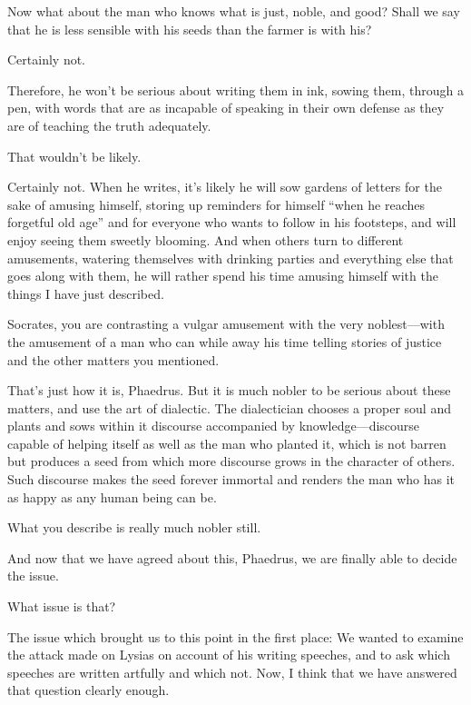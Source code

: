 \saysocrates Now what about the man who knows what is just, noble, and
good? Shall we say that he is less sensible with his seeds than the
farmer is with his?

\sayphaedrus Certainly not.

\saysocrates Therefore, he won’t be serious about writing them in ink,
sowing them, through a pen, with words that are as incapable of speaking
in their own defense as they are of teaching the truth adequately.

\sayphaedrus That wouldn’t be likely.

\saysocrates Certainly not. When he writes, it’s likely he will sow gardens 
of letters for the sake of amusing himself, storing up reminders
for himself “when he reaches forgetful old age” and for everyone who
wants to follow in his footsteps, and will enjoy seeing them sweetly
blooming. And when others turn to different amusements, watering
themselves with drinking parties and everything else that goes along
with them, he will rather spend his time amusing himself with the things
I have just described.

\sayphaedrus Socrates, you are contrasting a vulgar amusement with the 
very noblest---with the amusement of a man who can while away
his time telling stories of justice and the other matters you mentioned.

\saysocrates That’s just how it is, Phaedrus. But it is much nobler to be
serious about these matters, and use the art of dialectic. The
dialectician chooses a proper soul and plants and sows within it
discourse accompanied by knowledge---discourse capable of helping itself
as well as the man who planted it, which is not barren but produces a
seed from which more discourse grows in the character of
others. Such discourse makes the seed forever immortal and renders the
man who has it as happy as any human being can be.

\sayphaedrus What you describe is really much nobler still.

\saysocrates And now that we have agreed about this, Phaedrus, we are
finally able to decide the issue.

\sayphaedrus What issue is that?

\saysocrates The issue which brought us to this point in the first place:
We wanted to examine the attack made on Lysias on account of his writing speeches, and to ask which speeches are written artfully and
which not. Now, I think that we have answered that question clearly
enough.


